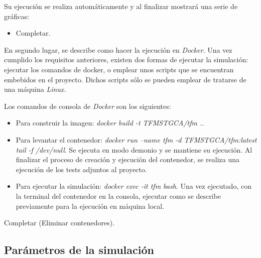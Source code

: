 Su ejecución se realiza automáticamente y al finalizar mostrará una serie de gráficas:

\begin{itemize}
  \item Completar.
\end{itemize}

En segundo lugar, se describe como hacer la ejecución en \textit{Docker}. Una vez cumplido los requisitos anteriores, existen dos
formas de ejecutar la simulación: ejecutar los comandos de docker, o emplear unos scripts que se encuentran embebidos en el proyecto.
Dichos scripts sólo se pueden emplear de tratarse de una máquina \textit{Linux}.

Los comandos de consola de \textit{Docker} son los siguientes:

\begin{itemize}
  \item Para construir la imagen: \textit{docker build -t TFMSTGCA/tfm .}.
  \item Para levantar el contenedor: \textit{docker run --name tfm -d TFMSTGCA/tfm:latest tail -f /dev/null}. Se ejecuta en modo demonio y se mantiene su
  ejecución. Al finalizar el proceso de creación y ejecución del contenedor, se realiza una ejecución de los tests adjuntos al proyecto.
  \item Para ejecutar la simulación: \textit{docker exec -it tfm bash}. Una vez ejecutado, con la terminal del contenedor en la consola, ejecutar como se describe previamente
  para la ejecución en máquina local.
\end{itemize}

Completar (Eliminar contenedores).

\subsection{Parámetros de la simulación}
